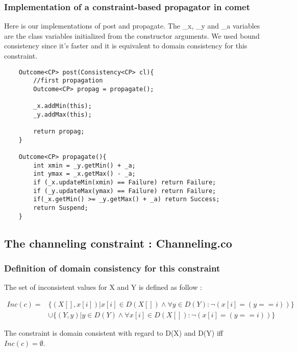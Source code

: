 \documentclass{eplDoc}
\begin{document}
\subsubsection{Implementation of a constraint-based propagator in comet}
Here is our implementations of post and propagate. The _x, _y and _a variables are the class variables initialized from the constructor arguments. We used bound consistency since it's faster and it is equivalent to domain consistency for this constraint. 

\begin{lstlisting}
    Outcome<CP> post(Consistency<CP> cl){
        //first propagation
        Outcome<CP> propag = propagate();
        
        _x.addMin(this);
        _y.addMax(this);

        return propag;
    }

    Outcome<CP> propagate(){
        int xmin = _y.getMin() + _a;
        int ymax = _x.getMax() - _a;
        if (_x.updateMin(xmin) == Failure) return Failure;
        if (_y.updateMax(ymax) == Failure) return Failure;
        if(_x.getMin() >= _y.getMax() + _a) return Success;
        return Suspend;
    }
\end{lstlisting}



\subsection{The channeling constraint : Channeling.co} %
\subsubsection{Definition of domain consistency for this constraint}
The set of inconsistent values for X and Y is defined as follow : 

\begin{align*}
Inc(c) = & \{(X[], x[i])|x[i] \in D(X[]) \wedge \forall y \in D(Y) : \neg(x[i]=(y==i))\} \\
 & \cup \{(Y, y)|y \in D(Y) \wedge \forall x[i] \in D(X[]) : \neg(x[i]=(y==i))\} 
\end{align*}

The constraint is domain consistent with regard to D(X) and D(Y) iff $Inc(c) = \emptyset$. 
\end{document}
